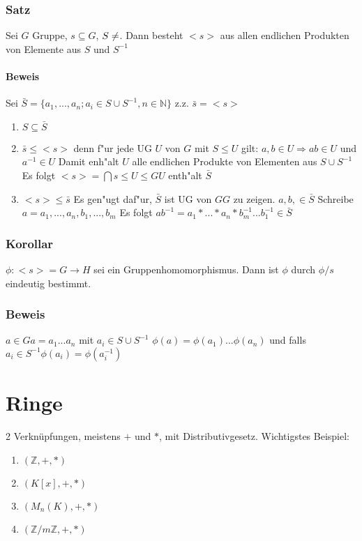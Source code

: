 \documentclass[12pt,a4paper,ngerman]{scrreprt}
\begin{document}
\subsection{Satz}
Sei $G$ Gruppe, $s \subseteq G$, $S \neq \empty$. 
Dann besteht $<s>$ aus allen endlichen Produkten von Elemente aus $S$ und $S^{-1}$ %

\subsubsection{Beweis}
Sei $\bar{S} = \{a_1, ..., a_n ; a_i \in S \cup S^{-1}, n \in \mathbb{N} \}$
z.z. $\bar{s} = <s>$
\begin{enumerate}[]
\item $S \subseteq \bar{S}$
\item $\bar{s} \leq <s>$ denn f"ur jede UG $U$ von $G$ mit $S \leq U$ gilt:
$a,b \in U \Rightarrow ab \in U$ und $a^{-1} \in U$
Damit enh"alt $U$ alle endlichen Produkte von Elementen aus $S \cup S^{-1}$
Es folgt $<s> = \bigcap{s \leq U \leq G}{U}$ enth"alt $\bar{S}$
\item $<s> \leq \bar{s}$ Es gen"ugt daf"ur, $\bar{S}$ ist UG von $GG$ zu zeigen. 
$a,b, \in \bar{S}$
Schreibe $a= a_1, ..., a_n, b_1, ... , b_m$
Es folgt $ab^{-1} = a_1* ... * a_n* b_m^{-1} ... b_1^{-1} \in \bar{S}$
\end{enumerate}

\subsection{Korollar}
$\phi : <s> = G \to H$ sei ein Gruppenhomomorphismus. 
Dann ist $\phi$ durch $\phi/s$ eindeutig bestimmt.

\subsection{Beweis}
$a \in G a=a_1 ... a_n $ mit $a_i \in S \cup S^{-1}$
$\phi(a) = \phi(a_1) ... \phi(a_n) $ und falls $a_i \in S^{-1} \phi(a_i) = \phi(a_i^{-1})$



\chapter{Ringe}

2 Verknüpfungen, meistens $+$ und $*$, mit Distributivgesetz. Wichtigstes Beispiel:
\begin{enumerate}[]
\item $(\mathbb{Z},+,*)$
\item $(K[x],+,*)$
\item $(M_n(K),+,*)$
\item $(\mathbb{Z}/m\mathbb{Z},+,*)$
\end{enumerate}
\end{document}
